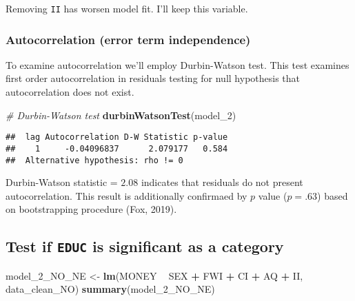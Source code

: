 \documentclass[]{article}
\newenvironment{Shaded}{\begin{snugshade}}{\end{snugshade}}
\newcommand{\CommentTok}[1]{\textcolor[rgb]{0.56,0.35,0.01}{\textit{#1}}}
\newcommand{\DecValTok}[1]{\textcolor[rgb]{0.00,0.00,0.81}{#1}}
\newcommand{\KeywordTok}[1]{\textcolor[rgb]{0.13,0.29,0.53}{\textbf{#1}}}
\newcommand{\NormalTok}[1]{#1}
\newcommand{\OperatorTok}[1]{\textcolor[rgb]{0.81,0.36,0.00}{\textbf{#1}}}
\newcommand{\StringTok}[1]{\textcolor[rgb]{0.31,0.60,0.02}{#1}}
\begin{document}
Removing \texttt{II} has worsen model fit. I'll keep this variable.

\hypertarget{autocorrelation-error-term-independence}{%
\subsubsection{Autocorrelation (error term
independence)}\label{autocorrelation-error-term-independence}}

To examine autocorrelation we'll employ Durbin-Watson test. This test
examines first order autocorrelation in residuals testing for null
hypothesis that autocorrelation does not exist.

\begin{Shaded}
\begin{Highlighting}[]
\CommentTok{# Durbin-Watson test}
\KeywordTok{durbinWatsonTest}\NormalTok{(model_}\DecValTok{2}\NormalTok{)}
\end{Highlighting}
\end{Shaded}

\begin{verbatim}
##  lag Autocorrelation D-W Statistic p-value
##    1     -0.04096837      2.079177   0.584
##  Alternative hypothesis: rho != 0
\end{verbatim}

Durbin-Watson statistic = \(2.08\) indicates that residuals do not
present autocorrelation. This result is additionally confirmaed by \(p\)
value (\(p = .63\)) based on bootstrapping procedure (Fox, 2019).

\hypertarget{test-if-educ-is-significant-as-a-category}{%
\subsection{\texorpdfstring{Test if \texttt{EDUC} is significant as a
category}{Test if EDUC is significant as a category}}\label{test-if-educ-is-significant-as-a-category}}

\begin{Shaded}
\begin{Highlighting}[]
\NormalTok{model_}\DecValTok{2}\NormalTok{_NO_NE <-}\StringTok{ }\KeywordTok{lm}\NormalTok{(MONEY }\OperatorTok{~}\StringTok{ }\NormalTok{SEX }\OperatorTok{+}\StringTok{ }\NormalTok{FWI }\OperatorTok{+}\StringTok{ }\NormalTok{CI }\OperatorTok{+}\StringTok{ }\NormalTok{AQ }\OperatorTok{+}\StringTok{ }\NormalTok{II, data_clean_NO)}
\KeywordTok{summary}\NormalTok{(model_}\DecValTok{2}\NormalTok{_NO_NE)}
\end{Highlighting}
\end{Shaded}
\end{document}
